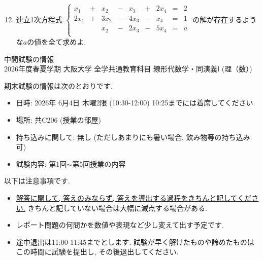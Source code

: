 \documentclass[dvipdfmx,a4paper,11pt]{article} %
\theoremstyle{definition}
\begin{document}
 \begin{enumerate}[label=\textbf{問題}\arabic*.]
 \setcounter{enumi}{11}
 \item
 連立1次方程式
 $
 \left\{ 
\begin{matrix}
x_1& +& x_2 &  -& x_3& + &2x_4&= & 2\\
2x_1&+&3x_2& -&4x_3&-&x_4&= & 1\\
	& &x_2& - &2x_3&-&5x_4&=&a \\
\end{matrix}
\right.
 $
 の解が存在するような$a$の値を全て求めよ.
 \end{enumerate}

\begin{center}
{\LARGE 中間試験の情報 } \\
2026年度春夏学期 大阪大学 全学共通教育科目 線形代数学・同演義Ⅰ (理（数）)
\end{center}

期末試験の情報は次のとおりです. 
\begin{itemize}
  \setlength{\parskip}{0cm} 
  \setlength{\itemsep}{0cm}
\item 日時: 2026年 6月4日 木曜2限 (10:30-12:00) 10:25までには着席してください.
\item 場所: 共C206 (授業の部屋)
\item 持ち込みに関して: 無し (ただしあまりにも暑い場合, 飲み物等の持ち込み可)
\item 試験内容: 第1回$\sim$第5回授業の内容
\end{itemize}
以下は注意事項です.
\begin{itemize}
  \setlength{\parskip}{0cm} 
 \setlength{\itemsep}{0cm}
 \item \underline{解答に関して, 答えのみならず, 答えを導出する過程をきちんと記してください.} きちんと記していない場合は大幅に減点する場合がある.
 \item レポート問題の何問かを数値や表現など少し変えて出す予定です. 
\item 途中退出は11:00-11:45までとします. 試験が早く解けたものや諦めたものはこの時間に試験を提出し, その後退出してください. 
\end{itemize}
\end{document}
